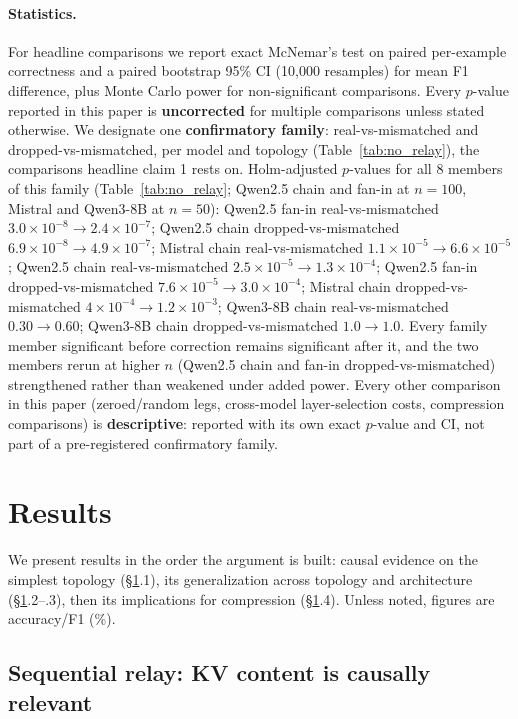 \documentclass[11pt]{article}
\begin{document}
\paragraph{Statistics.} For headline comparisons we report exact
McNemar's test on paired per-example correctness and a paired bootstrap
95\% CI (10,000 resamples) for mean F1 difference, plus Monte Carlo
power for non-significant comparisons. Every $p$-value reported in this
paper is \textbf{uncorrected} for multiple comparisons unless stated
otherwise. We designate one \textbf{confirmatory family}:
real-vs-mismatched and dropped-vs-mismatched, per model and topology
(Table~\ref{tab:no_relay}), the comparisons headline claim 1 rests on.
Holm-adjusted $p$-values for all 8 members of this family
(Table~\ref{tab:no_relay}; Qwen2.5 chain and fan-in at $n=100$, Mistral
and Qwen3-8B at $n=50$): Qwen2.5 fan-in real-vs-mismatched
$3.0\times10^{-8} \to 2.4\times10^{-7}$; Qwen2.5 chain
dropped-vs-mismatched $6.9\times10^{-8} \to 4.9\times10^{-7}$; Mistral
chain real-vs-mismatched $1.1\times10^{-5} \to 6.6\times10^{-5}$;
Qwen2.5 chain real-vs-mismatched $2.5\times10^{-5} \to 1.3\times10^{-4}$;
Qwen2.5 fan-in dropped-vs-mismatched $7.6\times10^{-5} \to
3.0\times10^{-4}$; Mistral chain dropped-vs-mismatched $4\times10^{-4}
\to 1.2\times10^{-3}$; Qwen3-8B chain real-vs-mismatched $0.30 \to
0.60$; Qwen3-8B chain dropped-vs-mismatched $1.0 \to 1.0$. Every family
member significant before correction remains significant after it, and
the two members rerun at higher $n$ (Qwen2.5 chain and fan-in
dropped-vs-mismatched) strengthened rather than weakened under added
power. Every other comparison in this paper (zeroed/random legs,
cross-model layer-selection costs, compression comparisons) is
\textbf{descriptive}: reported with its own exact $p$-value and CI, not
part of a pre-registered confirmatory family.

\section{Results}
\label{sec:results}

We present results in the order the argument is built: causal evidence
on the simplest topology (\S\ref{sec:results}.1), its generalization
across topology and architecture (\S\ref{sec:results}.2--.3), then its
implications for compression (\S\ref{sec:results}.4). Unless noted,
figures are accuracy/F1 (\%).



\subsection{Sequential relay: KV content is causally relevant}
\end{document}
